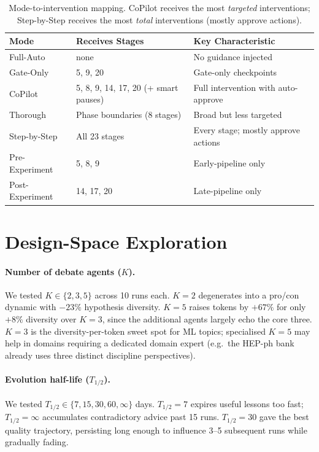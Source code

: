 \documentclass{llmxive}
\begin{document}
\begin{table}[!htbp]
\centering
\small
\begin{tabular}{@{}lll@{}}
\toprule
\textbf{Mode} & \textbf{Receives Stages} & \textbf{Key Characteristic} \\
\midrule
Full-Auto & none & No guidance injected \\
Gate-Only & 5, 9, 20 & Gate-only checkpoints \\
CoPilot & 5, 8, 9, 14, 17, 20 (+ smart pauses) & Full intervention with auto-approve \\
Thorough & Phase boundaries (8 stages) & Broad but less targeted \\
Step-by-Step & All 23 stages & Every stage; mostly approve actions \\
Pre-Experiment & 5, 8, 9 & Early-pipeline only \\
Post-Experiment & 14, 17, 20 & Late-pipeline only \\
\bottomrule
\end{tabular}
\caption{Mode-to-intervention mapping. CoPilot receives the most \emph{targeted} interventions; Step-by-Step receives the most \emph{total} interventions (mostly approve actions).}
\label{tab:mode-mapping}
\end{table}

\section{Design-Space Exploration}
\label{app:agent_count}

\paragraph{Number of debate agents (\texorpdfstring{$K$}{K}).}
We tested $K \in \{2, 3, 5\}$ across 10 runs each. $K{=}2$ degenerates into a
pro/con dynamic with $-23\%$ hypothesis diversity. $K{=}5$ raises tokens by $+67\%$
for only $+8\%$ diversity over $K{=}3$, since the additional agents largely echo
the core three. $K{=}3$ is the diversity-per-token sweet spot for ML topics;
specialised $K{=}5$ may help in domains requiring a dedicated domain expert
(e.g.\ the HEP-ph bank already uses three distinct discipline perspectives).

\paragraph{Evolution half-life (\texorpdfstring{$T_{1/2}$}{T1/2}).}
We tested $T_{1/2} \in \{7, 15, 30, 60, \infty\}$ days. $T_{1/2}{=}7$ expires
useful lessons too fast; $T_{1/2}{=}\infty$ accumulates contradictory advice past
15 runs. $T_{1/2}{=}30$ gave the best quality trajectory, persisting long enough to
influence 3--5 subsequent runs while gradually fading.
\end{document}
